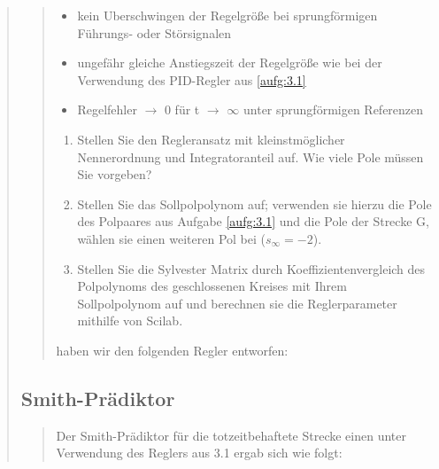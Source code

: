 \begin{quote}
\begin{quote}
        \begin{itemize}
            
            \item kein Uberschwingen der Regelgröße bei sprungförmigen Führungs- oder Störsignalen
            
            \item ungefähr gleiche Anstiegszeit der Regelgröße wie bei der Verwendung des PID-Regler aus
            \ref{aufg:3.1}
            
            \item Regelfehler $\to$ 0 für t $\to$ $\infty$ unter sprungförmigen Referenzen
        
        \end{itemize}
        \vspace{1em}
        
        \begin{enumerate}
            
            \item Stellen Sie den Regleransatz mit kleinstmöglicher Nennerordnung und Integratoranteil auf. Wie viele Pole
            müssen Sie vorgeben?\\
            
            \item Stellen Sie das Sollpolpolynom auf; verwenden sie hierzu die Pole des Polpaares aus Aufgabe \ref{aufg:3.1}
            und die Pole der Strecke G, wählen sie einen weiteren Pol bei ($s_\infty = -2$).\\
            
            \item Stellen Sie die Sylvester Matrix durch Koeffizientenvergleich des Polpolynoms des geschlossenen Kreises
            mit Ihrem Sollpolpolynom auf und berechnen sie die Reglerparameter mithilfe von Scilab.\\
        
        \end{enumerate}
        
        
        haben wir den folgenden Regler entworfen:
        
        
        
    \end{quote}
    
    
    
    \subsection{Smith-Prädiktor}
    \begin{quote}
        
        Der Smith-Prädiktor für die totzeitbehaftete Strecke einen unter Verwendung des Reglers aus 3.1 ergab sich wie
        folgt:
        
        
    \end{quote}
    
    
    
    
\end{quote} %

